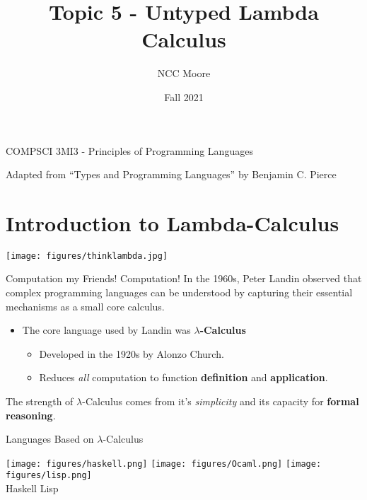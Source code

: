 \documentclass[11pt]{beamer}
\author{NCC Moore}
\title{Topic 5 - Untyped Lambda Calculus}
\institute{McMaster University}
\date{Fall 2021}
\begin{document}
\begin{frame}
\center
COMPSCI 3MI3 - Principles of Programming Languages
\titlepage

Adapted from ``Types and Programming Languages'' by Benjamin C. Pierce 
\end{frame}

\begin{frame}
\tableofcontents
\end{frame}

\section[Intro]{Introduction to Lambda-Calculus}

\begin{frame}[fragile=singleslide]{}
\begin{center}
\texttt{[image: figures/thinklambda.jpg]}
\end{center}
\end{frame}

\begin{frame}[fragile=singleslide]{Computation my Friends! Computation!}
In the 1960s, Peter Landin observed that complex programming languages can be understood by capturing their essential mechanisms as a small core calculus.  
\begin{itemize}
\item The core language used by Landin was \textbf{$\lambda$-Calculus}
\begin{itemize}
\item Developed in the 1920s by Alonzo Church.
\item Reduces \emph{all} computation to function \textbf{definition} and \textbf{application}.
\end{itemize}
\end{itemize}
The strength of $\lambda$-Calculus comes from it's \emph{simplicity} and its capacity for \textbf{formal reasoning}. 
\end{frame}

\begin{frame}[fragile=singleslide]{Languages Based on $\lambda$-Calculus }
\begin{center}
\texttt{[image: figures/haskell.png]} 
\texttt{[image: figures/Ocaml.png]} 
\texttt{[image: figures/lisp.png]} \\
Haskell \hspace{14em} Lisp \\
\vspace{2em}
\end{center}
\end{frame}
\end{document}
